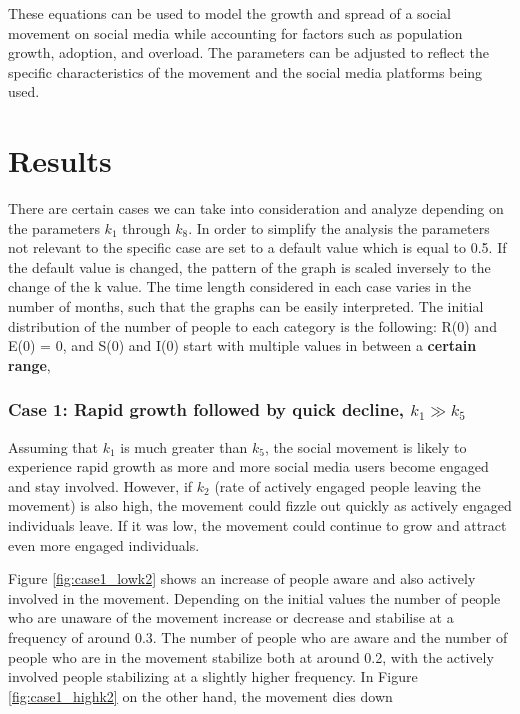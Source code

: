 \documentclass{article}
\begin{document}
	These equations can be used to model the growth and spread of a social movement on social media while accounting for factors such as population growth, adoption, and overload. The parameters can be adjusted to reflect the specific characteristics of the movement and the social media platforms being used.
 

    \section{Results}
    
    There are certain cases we can take into consideration and analyze depending on the parameters $k_1$ through $k_8$. In order to simplify the analysis the parameters not relevant to the specific case are set to a default value which is equal to 0.5. If the default value is changed, the pattern of the graph is scaled inversely to the change of the k value.
    The time length considered in each case varies in the number of months, such that the graphs can be easily interpreted. The initial distribution of the number of people to each category is the following: R(0) and E(0) = 0, and S(0) and I(0) start with multiple values in between a \textbf{certain range}, 


    \subsubsection*{Case 1: Rapid growth followed by quick decline, $k_1 \gg k_5$} \normalfont
    Assuming that $k_1$  is much greater than $k_5$, the social movement is likely to experience rapid growth as more and more social media users become engaged and stay involved. However, if $k_2$ (rate of actively engaged people leaving the movement) is also high, the movement could fizzle out quickly as actively engaged individuals leave. If it was low, the movement could continue to grow and attract even more engaged individuals.

    Figure \ref{fig:case1_lowk2} shows an increase of people aware and also actively involved in the movement. Depending on the initial values the number of people who are unaware of the movement increase or decrease and stabilise at a frequency of around 0.3. The number of people who are aware and the number of people who are in the movement stabilize both at around 0.2, with the actively involved people stabilizing at a slightly higher frequency.
    In Figure \ref{fig:case1_highk2} on the other hand, the movement dies down
    
\end{document}
